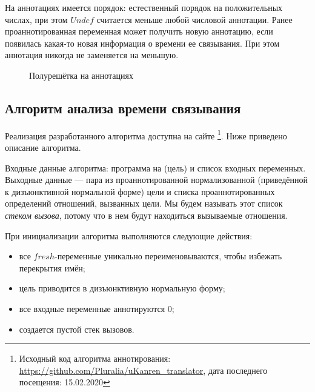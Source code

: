 \documentclass[conference,american,russian]{IEEEtran}
\begin{document}
На аннотациях имеется порядок: естественный порядок на положительных числах, при этом $Undef$ считается меньше любой числовой аннотации.
Ранее проаннотированная переменная может получить новую аннотацию, если появилась какая-то новая информация о времени ее связывания.
При этом аннотация никогда не заменяется на меньшую. 

\begin{figure}[htbp]
  \centering
  \caption{Полурешётка на аннотациях}
  \label{fig:image}
\end{figure}

\subsection{Алгоритм анализа времени связывания}

Реализация разработанного алгоритма доступна на сайте \github{}\footnote{Исходный код алгоритма аннотирования: \url{https://github.com/Pluralia/uKanren\_translator}, дата последнего посещения: 15.02.2020}. Ниже приведено описание алгоритма.

Входные данные алгоритма: программа на \miniKanren{} (цель) и список входных переменных.
Выходные данные --- пара из проаннотированной нормализованной (приведённой к дизъюнктивной нормальной форме) цели и списка проаннотированных определений отношений, вызванных цели. 
Мы будем называть этот список \emph{стеком вызова}, потому что в нем будут находиться вызываемые отношения.

При инициализации алгоритма выполняются следующие действия: 
\begin{itemize}
    \item все $fresh$-переменные уникально переименовываются, чтобы избежать перекрытия имён;
    \item цель приводится в дизъюнктивную нормальную форму;
    \item все входные переменные аннотируются $0$;
    \item создается пустой стек вызовов.
\end{itemize}
\end{document}
